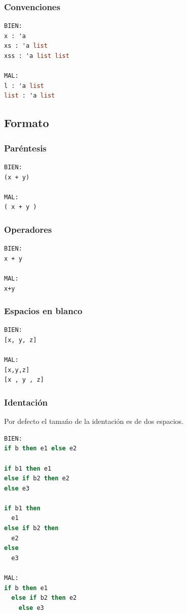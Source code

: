 \documentclass[10pt,journal,compsoc]{IEEEtran}
\begin{document}
\subsubsection{Convenciones}
\begin{lstlisting}[language=ML, caption=Ejemplo convenciones]
BIEN:
x : 'a 
xs : 'a list 
xss : 'a list list

MAL:
l : 'a list 
list : 'a list
\end{lstlisting}

\subsection{Formato}
\subsubsection{Par\'entesis}
\begin{lstlisting}[language=ML, caption=Convenci\'on par\'entesis]
BIEN:
(x + y)

MAL:
( x + y )
\end{lstlisting}
\subsubsection{Operadores}
\begin{lstlisting}[language=ML, caption=Convenci\'on operadores]
BIEN:
x + y

MAL:
x+y
\end{lstlisting}
\subsubsection{Espacios en blanco}
\begin{lstlisting}[language=ML, caption=Convenci\'on espacios en blanco]
BIEN:
[x, y, z]

MAL:
[x,y,z] 
[x , y , z]
\end{lstlisting}

\subsubsection{Identaci\'on}
Por defecto el tama\'no de la identaci\'on es de dos espacios.
\begin{lstlisting}[language=ML, caption=Convenci\'on identaci\'on]
BIEN:
if b then e1 else e2

if b1 then e1
else if b2 then e2
else e3

if b1 then
  e1
else if b2 then
  e2
else
  e3

MAL:
if b then e1
  else if b2 then e2
    else e3
\end{lstlisting}
\end{document}

